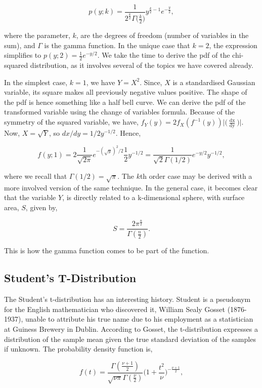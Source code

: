 \documentclass[11pt]{amsart}
\begin{document}
$$p(y; k) = \frac{1}{2^{\frac{k}{2}}\Gamma\big(\frac{k}{2}\big)}y^{\frac{k}{2} - 1}e^{-\frac{y}{2}},$$

where the parameter, $k$, are the degrees of freedom (number of variables in the sum), and $\Gamma$ is the gamma function. In the unique case that $k = 2$, the expression simplifies to $p(y; 2) = \frac{1}{2}e^{-y/2}$. We take the time to derive the pdf of the chi-squared distribution, as it involves several of the topics we have covered already.

In the simplest case, $k = 1$, we have $Y = X^2$. Since, $X$ is a standardised Gaussian variable, its square makes all previously negative values positive. The shape of the pdf is hence something like a half bell curve. We can derive the pdf of the transformed variable using the change of variables formula. Because of the symmetry of the squared variable, we have, $f_Y(y) = 2f_X(f^{-1}(y))\Big|\Big(\frac{\mathop{dx}}{\mathop{dy}}\Big)\Big|$. Now, $X = \sqrt{Y}$, so $dx/dy = 1/2y^{-1/2} $. Hence,

$$f(y; 1) = 2\frac{1}{\sqrt{2\pi}}e^{-(\sqrt{y})^2/2}\frac{1}{2}y^{-1/2} = \frac{1}{\sqrt{2}\Gamma(1/2)}e^{-y/2}y^{-1/2},$$

where we recall that $\Gamma(1/2) = \sqrt{\pi}$. The $k$th order case may be derived with a more involved version of the same technique. In the general case, it becomes clear that the variable $Y$, is directly related to a k-dimensional sphere, with surface area, $S$, given by,

$$S = \frac{2\pi^{\frac{n}{2}}}{\Gamma(\frac{n}{2})}.$$

This is how the gamma function comes to be part of the function.

\subsection{Student's T-Distribution}

The Student's t-distribution has an interesting history. Student is a pseudonym for the English mathematician who discovered it, William Sealy Gosset (1876-1937), unable to attribute his true name due to his employment as a statistician at Guiness Brewery in Dublin. According to Gosset, the t-distribution expresses a distribution of the sample mean given the true standard deviation of the samples if unknown. The probability density function is,

$$f(t) = \frac{\Gamma(\frac{\nu + 1}{2})}{\sqrt{\nu\pi}\Gamma(\frac{\nu}{2})}\Bigg(1 + \frac{t^2}{\nu}\Bigg)^{-\frac{\nu + 1}{2}},$$
\end{document}
